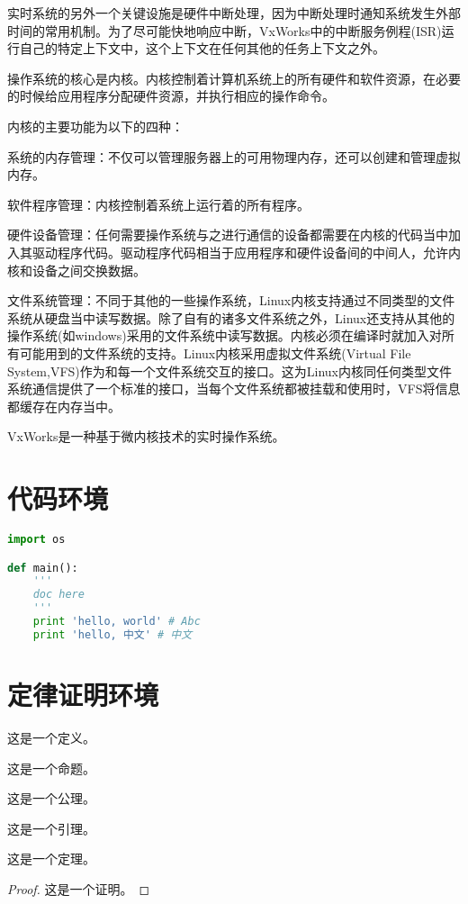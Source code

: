 \documentclass[format=draft,language=chinese,degree=master]{hustthesis}
\begin{document}
	实时系统的另外一个关键设施是硬件中断处理，因为中断处理时通知系统发生外部时间的常用机制。为了尽可能快地响应中断，VxWorks中的中断服务例程(ISR)运行自己的特定上下文中，这个上下文在任何其他的任务上下文之外\cite{Wind2003VxWorks}。

操作系统的核心是内核。内核控制着计算机系统上的所有硬件和软件资源，在必要的时候给应用程序分配硬件资源，并执行相应的操作命令。

	内核的主要功能为以下的四种：

\bullet 系统的内存管理：不仅可以管理服务器上的可用物理内存，还可以创建和管理虚拟内存。

\bullet 软件程序管理：内核控制着系统上运行着的所有程序。

\bullet 硬件设备管理：任何需要操作系统与之进行通信的设备都需要在内核的代码当中加入其驱动程序代码。驱动程序代码相当于应用程序和硬件设备间的中间人，允许内核和设备之间交换数据。

\bullet 文件系统管理：不同于其他的一些操作系统，Linux内核支持通过不同类型的文件系统从硬盘当中读写数据。除了自有的诸多文件系统之外，Linux还支持从其他的操作系统(如windows)采用的文件系统中读写数据。内核必须在编译时就加入对所有可能用到的文件系统的支持。Linux内核采用虚拟文件系统(Virtual File System,VFS)作为和每一个文件系统交互的接口。这为Linux内核同任何类型文件系统通信提供了一个标准的接口，当每个文件系统都被挂载和使用时，VFS将信息都缓存在内存当中。

VxWorks是一种基于微内核技术的实时操作系统。


\section{代码环境}

\begin{lstlisting}[language=python]
import os

def main():
    '''
    doc here
    '''
    print 'hello, world' # Abc
    print 'hello, 中文' # 中文
\end{lstlisting}

\section{定律证明环境}

\begin{definition}\label{def:1}
这是一个定义。
\end{definition}
\begin{proposition}\label{proposition:1}
这是一个命题。
\end{proposition}
\begin{axiom}\label{axiom:1}
这是一个公理。
\end{axiom}
\begin{lemma}\label{lemma:1}
这是一个引理。
\end{lemma}
\begin{theorem}\label{theorem:1}
这是一个定理。
\end{theorem}
\begin{proof}\label{proof:1}
这是一个证明。
\end{proof}
\end{document}
